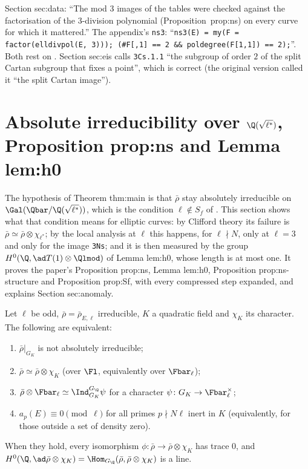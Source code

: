 \begin{paperlink}
Section sec:data: ``The mod $3$ images of the tables were checked against the factorisation of the $3$-division polynomial (Proposition~prop:ns) on every curve for which it mattered.'' The appendix's
\texttt{ns3}: ``\texttt{ns3(E) = my(F = factor(elldivpol(E, 3))); (\#F[,1] == 2 \&\& poldegree(F[1,1]) == 2);}''. Both rest on
. Section sec:eis calls \texttt{3Cs.1.1} ``the subgroup of order $2$ of the split Cartan subgroup that fixes a point'',
which is correct (the original version called it ``the split Cartan image'').
\end{paperlink}

\section[Absolute irreducibility over \texorpdfstring{$\Q(\sqrt{\ell^*})$}{Q(sqrt l*)}]{Absolute irreducibility over \texorpdfstring{$\Q(\sqrt{\ell^*})$}{Q(sqrt l*)}, Proposition prop:ns and Lemma lem:h0}\label{sec:galrep:lstar}

The hypothesis of Theorem thm:main is that $\bar\rho$ stay absolutely irreducible on $\Gal(\Qbar/\Q(\sqrt{\ell^*}))$, which is the condition $\ell\notin S_f$ of
\cite[(31)]{DFG04}. This section shows what that condition means for elliptic curves: by Clifford theory its failure is $\bar\rho\simeq\bar\rho\otimes\chi_{\ell^*}$; by the
local analysis at $\ell$ this happens, for $\ell\nmid N$, only at $\ell=3$ and only for the image \texttt{3Ns}; and it is then measured by the group
$H^0(\Q,\ad T(1)\otimes\Qlmod)$ of Lemma lem:h0, whose length is at most one. It proves the paper's Proposition prop:ns, Lemma lem:h0, Proposition
prop:ns-structure and Proposition prop:Sf, with every compressed step expanded, and explains Section sec:anomaly.

\begin{proposition}\label{prop:galrep:dihedral}
Let $\ell$ be odd, $\bar\rho=\bar\rho_{E,\ell}$ irreducible, $K$ a quadratic field and $\chi_K$ its character. The following are equivalent:
\begin{enumerate}[label=(\alph*)]
\item $\bar\rho|_{G_K}$ is not absolutely irreducible;
\item $\bar\rho\simeq\bar\rho\otimes\chi_K$ (over $\Fl$, equivalently over $\Fbar_\ell$);
\item $\bar\rho\otimes\Fbar_\ell\simeq\Ind_{G_K}^{G_\Q}\psi$ for a character $\psi\colon G_K\to\Fbar_\ell^\times$;
\item $a_p(E)\equiv0\pmod\ell$ for all primes $p\nmid N\ell$ inert in $K$ (equivalently, for those outside a set of density zero).
\end{enumerate}
When they hold, every isomorphism $\phi\colon\bar\rho\to\bar\rho\otimes\chi_K$ has trace $0$, and $H^0(\Q,\ad\bar\rho\otimes\chi_K)=\Hom_{G_\Q}(\bar\rho,\bar\rho\otimes\chi_K)$ is a line.
\end{proposition}

